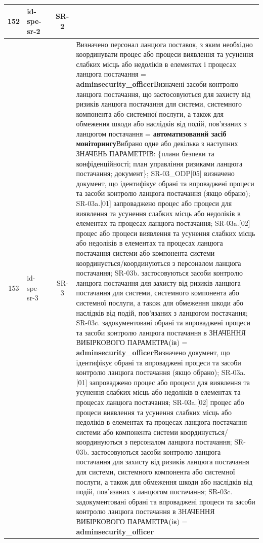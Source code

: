 \documentclass[10pt]{article}
\begin{document}
\begin{longtable}{|c|>{\raggedright\arraybackslash}p{2.5cm}|>{\raggedright\arraybackslash}p{4.5cm}|c|>{\raggedright\arraybackslash}p{4.5cm}|}
152 & id-spe-sr-2 &  & SR-2 &  \\ \hline
153 & id-spe-sr-3 &  & SR-3 & Визначено персонал ланцюга поставок, з яким необхідно координувати процес або процеси виявлення та усунення слабких місць або недоліків в елементах і процесах ланцюга постачання = \textbf{adminsecurity\_\allowbreak{}officer}\newline Визначені засоби контролю ланцюга постачання, що застосовуються для захисту від ризиків ланцюга постачання для системи, системного компонента або системної послуги, а також для обмеження шкоди або наслідків від подій, пов'язаних з ланцюгом постачання = \textbf{автоматизований засіб моніторингу}\newline Вибрано одне або декілька з наступних ЗНАЧЕНЬ ПАРАМЕТРІВ: \{плани безпеки та конфіденційності; план управління ризиками ланцюга постачання; документ\}; SR-03\_\allowbreak{}ODP[05] визначено документ, що ідентифікує обрані та впроваджені процеси та засоби контролю ланцюга постачання (якщо обрано); SR-03a.[01] запроваджено процес або процеси для виявлення та усунення слабких місць або недоліків в елементах та процесах ланцюга постачання; SR-03a.[02] процес або процеси виявлення та усунення слабких місць або недоліків в елементах та процесах ланцюга постачання системи або компонента системи координується/координуються з персоналом ланцюга постачання; SR-03b. застосовуються засоби контролю ланцюга постачання для захисту від ризиків ланцюга постачання для системи, системного компонента або системної послуги, а також для обмеження шкоди або наслідків від подій, пов'язаних з ланцюгом постачання; SR-03c. задокументовані обрані та впроваджені процеси та засоби контролю ланцюга постачання в ЗНАЧЕННЯ ВИБІРКОВОГО ПАРАМЕТРА(ів) = \textbf{adminsecurity\_\allowbreak{}officer}\newline Визначено документ, що ідентифікує обрані та впроваджені процеси та засоби контролю ланцюга постачання (якщо обрано); SR-03a.[01] запроваджено процес або процеси для виявлення та усунення слабких місць або недоліків в елементах та процесах ланцюга постачання; SR-03a.[02] процес або процеси виявлення та усунення слабких місць або недоліків в елементах та процесах ланцюга постачання системи або компонента системи координується/координуються з персоналом ланцюга постачання; SR-03b. застосовуються засоби контролю ланцюга постачання для захисту від ризиків ланцюга постачання для системи, системного компонента або системної послуги, а також для обмеження шкоди або наслідків від подій, пов'язаних з ланцюгом постачання; SR-03c. задокументовані обрані та впроваджені процеси та засоби контролю ланцюга постачання в ЗНАЧЕННЯ ВИБІРКОВОГО ПАРАМЕТРА(ів) = \textbf{adminsecurity\_\allowbreak{}officer} \\ \hline

\end{longtable}
\end{document}
